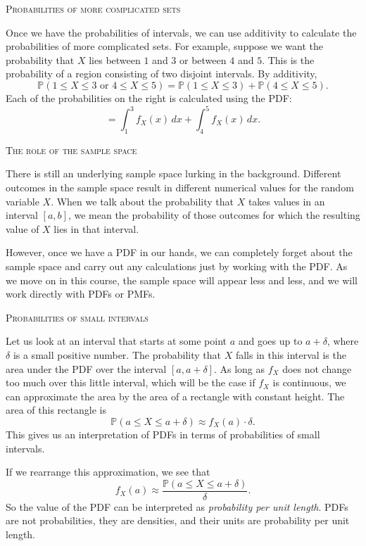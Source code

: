 \bigskip\textsc{Probabilities of more complicated sets}

Once we have the probabilities of intervals, we can use additivity to calculate the probabilities of more complicated sets.  
For example, suppose we want the probability that \(X\) lies between \(1\) and \(3\) or between \(4\) and \(5\).  
This is the probability of a region consisting of two disjoint intervals.  
By additivity,
\[
\mathbb{P}(1 \le X \le 3 \text{ or } 4 \le X \le 5) = \mathbb{P}(1 \le X \le 3) + \mathbb{P}(4 \le X \le 5).
\]
Each of the probabilities on the right is calculated using the PDF:
\[
= \int_1^3 f_X(x) \, dx + \int_4^5 f_X(x) \, dx.
\]

\bigskip\textsc{The role of the sample space}

There is still an underlying sample space lurking in the background.  
Different outcomes in the sample space result in different numerical values for the random variable \(X\).  
When we talk about the probability that \(X\) takes values in an interval \([a, b]\), we mean the probability of those outcomes for which the resulting value of \(X\) lies in that interval.

However, once we have a PDF in our hands, we can completely forget about the sample space and carry out any calculations just by working with the PDF.  
As we move on in this course, the sample space will appear less and less, and we will work directly with PDFs or PMFs.

\newpage
\bigskip\textsc{Probabilities of small intervals}

Let us look at an interval that starts at some point \(a\) and goes up to \(a + \delta\), where \(\delta\) is a small positive number.  
The probability that \(X\) falls in this interval is the area under the PDF over the interval \([a, a + \delta]\).  
As long as \(f_X\) does not change too much over this little interval, which will be the case if \(f_X\) is continuous, we can approximate the area by the area of a rectangle with constant height.  
The area of this rectangle is
\[
\mathbb{P}(a \le X \le a + \delta) \approx f_X(a) \cdot \delta.
\]
This gives us an interpretation of PDFs in terms of probabilities of small intervals.

If we rearrange this approximation, we see that
\[
f_X(a) \approx \frac{\mathbb{P}(a \le X \le a + \delta)}{\delta}.
\]
So the value of the PDF can be interpreted as \textit{probability per unit length}.  
PDFs are not probabilities, they are densities, and their units are probability per unit length.

